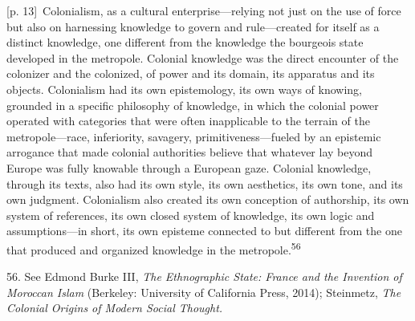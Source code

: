 \documentclass[10pt,a4paper]{article}
\begin{document}
{\scriptsize\color{gray} [p. 13]}\ Colonialism, as a cultural enterprise—relying not just on the use of force but also on harnessing knowledge to govern and rule—created for itself as a distinct knowledge, one different from the knowledge the bourgeois state developed in the metropole. Colonial knowledge was the direct encounter of the colonizer and the colonized, of power and its domain, its apparatus and its objects. Colonialism had its own epistemology, its own ways of knowing, grounded in a specific philosophy of knowledge, in which the colonial power operated with categories that were often inapplicable to the terrain of the metropole—race, inferiority, savagery, primitiveness—fueled by an epistemic arrogance that made colonial authorities believe that whatever lay beyond Europe was fully knowable through a European gaze. Colonial knowledge, through its texts, also had its own style, its own aesthetics, its own tone, and its own judgment. Colonialism also created its own conception of authorship, its own system of references, its own closed system of knowledge, its own logic and assumptions—in short, its own episteme connected to but different from the one that produced and organized knowledge in the metropole.\nobreak\textsuperscript{56}\par{\small 56. See Edmond Burke III, \textit{The Ethnographic State: France and the Invention of Moroccan Islam} (Berkeley: University of California Press, 2014); Steinmetz, \textit{The Colonial Origins of Modern Social Thought.}\par}
\end{document}
